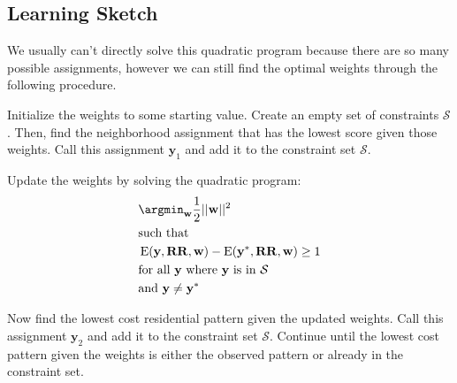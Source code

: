 \subsection*{Learning Sketch}
We usually can't directly solve this quadratic program because there
are so many possible assignments, however we can still find the
optimal weights through the following procedure.

Initialize the weights to some starting value. Create an empty set of
constraints $\mathcal{S}$. Then, find the neighborhood assignment that
has the lowest score given those weights. Call this assignment
$\mathbf{y}_1$ and add it to the constraint set $\mathcal{S}$.

Update the weights by solving the quadratic program: 
%
\begin{align*}
&\argmin_{\mathbf{w}} \frac{1}{2}||\mathbf{w}||^2 \\
&\text{such that} \\
&\operatorname{E}(\mathbf{y}, \mathbf{RR}, \mathbf{w})
- \operatorname{E}(\mathbf{y}^*, \mathbf{RR}, \mathbf{w}) \geq 1 \\ 
&\text{for all } \mathbf{y} \text{ where } \mathbf{y} \text{ is in } \mathcal{S}\\
&\text{and } \mathbf{y} \neq \mathbf{y}^*
\end{align*}
%

Now find the lowest cost residential pattern given the updated
weights. Call this assignment $\mathbf{y}_2$ and add it to the
constraint set $\mathcal{S}$. Continue until the lowest cost
pattern given the weights is either the observed pattern or
already in the constraint set.\cite{szummer_learning_2008}

